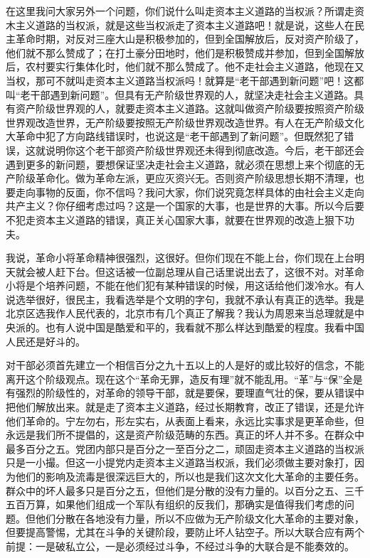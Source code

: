 在这里我问大家另外一个问题，你们说什么叫走资本主义道路的当权派？所谓走资木主义道路的当权派，就是这些当权派走了资本主义道路吧！就是说，这些人在民主革命时期，对反对三座大山是积极参加的，但到全国解放后，反对资产阶级了，他们就不那么赞成了；在打土豪分田地时，他们是积极赞成并参加，但到全国解放后，农村要实行集体化时，他们就不那么赞成了。他不走社会主义道路，他现在又当权，那可不就叫走资本主义道路当权派吗！就算是“老干部遇到新问题”吧！这都叫“老干部遇到新问题”。但具有无产阶级世界观的人，就坚决走社会主义道路。具有资产阶级世界观的人，就要走资本主义道路。这就叫做资产阶级要按照资产阶级世界观改造世界，无产阶级要按照无产阶级世界观改造世界。有人在无产阶级文化大革命中犯了方向路线错误时，也说这是“老干部遇到了新问题”。但既然犯了错误，这就说明你这个老干部资产阶级世界观还未得到彻底改造。今后，老干部还会遇到更多的新问题，要想保证坚决走社会主义道路，就必须在思想上来个彻底的无产阶级革命化。{做为革命左派，更应灭资兴无。否则资产阶级思想长期不清理，也要走向事物的反面，你不信吗？我问大家，你们说究竟怎样具体的由社会主义走向共产主义？你仔细考虑过吗？这是一个国家的大事，也是世界的大事。所以今后要不犯走资本主义道路的错误，真正关心国家大事，就要在世界观的改造上狠下功夫。}

我说，革命小将革命精神很强烈，这很好。但你们现在不能上台，你们现在上台明天就会被人赶下台。但这话被一位副总理从自己话里说出去了，这很不对。对革命小将是个培养问题，不能在他们犯有某种错误的时候，用这话给他们泼冷水。有人说选举很好，很民主，我看选举是个文明的字句，我就不承认有真正的选举。我是北京区选我作人民代表的，北京市有几个真正了解我？我认为周恩来当总理就是中央派的。也有人说中国是酷爱和平的，我看就不那么样达到酷爱的程度。我看中国人民还是好斗的。

对干部必须首先建立一个相信百分之九十五以上的人是好的或比较好的信念，不能离开这个阶级观点。现在这个“革命无罪，造反有理”就不能乱用。“革”与“保”全是有强烈的阶级性的，对革命的领导干部，就是要保，要理直气壮的保，要从错误中把他们解放出来。就是走了资本主义道路，经过长期教育，改正了错误，还是允许他们革命的。宁左勿右，形左实右，从表面上看来，永远比实事求是更革命些，但永远是我们所不提倡的，这是资产阶级范畴的东西。真正的坏人并不多。在群众中最多百分之五。党团内部只是百分之一至百分之二，顽固走资本主义道路的当权派只是一小撮。但这一小提党内走资本主义道路当权派，我们必须做主要对象打，因为他们的影响及流毒是很深远巨大的，所以也是我们这次文化大革命的主要任务。群众中的坏人最多只是百分之五，但他们是分散的没有力量的。以百分之五、三千五百万算，如果他们组成一个军队有组织的反我们，那确实是值得我们考虑的问题。但他们分散在各地没有力量，所以不应做为无产阶级文化大革命的主要对象，但要提高警惕，尤其在斗争的关键阶段，要防止坏人钻空子。所以大联合应有两个前提：一是破私立公，一是必须经过斗争，不经过斗争的大联合是不能奏效的。

